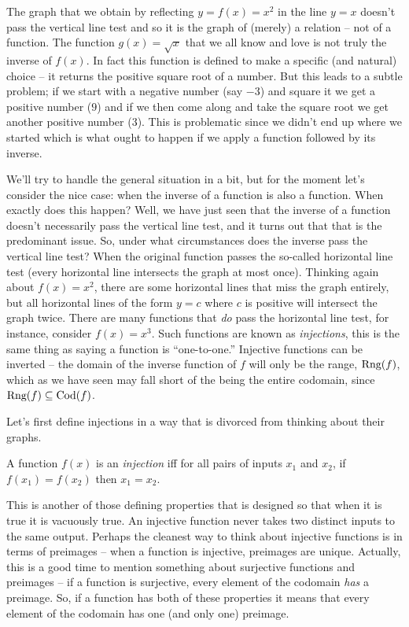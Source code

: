 The graph that we obtain by reflecting $y=f(x)=x^2$ in the line $y=x$ doesn't
pass the vertical line test and so it is the graph of (merely) a relation 
-- not of a function.  The function $g(x) = \sqrt{x}$ that we all know 
and love is not truly the inverse of $f(x)$.  In fact this function is
defined to make a specific (and natural) choice -- it returns the positive
square root of a number.  But this leads to a subtle problem; if we start
with a negative number (say $-3$) and square it we get a positive number ($9$)
and if we then come along and take the square root we get another positive
number ($3$).  This is problematic since we didn't end up where we started
which is what ought to happen if we apply a function followed by its inverse.

We'll try to handle the general situation in a bit, but for the moment let's
consider the nice case: when the inverse of a function is also a function. 
When exactly does this happen?  Well, we have just seen that the inverse
of a function doesn't necessarily pass the vertical line test, and it turns
out that that is the predominant issue.  So, under what circumstances does
the inverse pass the vertical line test?  When the original function 
passes the so-called horizontal line test (every horizontal line
intersects the graph at most once).  Thinking again about $f(x)=x^2$, there
are some horizontal lines that miss the graph entirely, but all horizontal
lines of the form $y=c$ where $c$ is positive will intersect the graph twice.
There are many functions that \emph{do} pass the horizontal line test, for 
instance, consider $f(x) = x^3$.  Such functions are known as 
\emph{injections}, this is the same thing as 
saying a function is ``one-to-one.''   Injective functions can be inverted --
the domain of the inverse function of $f$ will only be the range, $\mbox{Rng}(f)$,
which as we have seen may fall short of the being the entire codomain, since 
$\mbox{Rng}(f) \subseteq \mbox{Cod}(f)$.

Let's first define injections in a way that is divorced from thinking
about their graphs.

\begin{defi}
A function $f(x)$ is an \emph{injection} iff for all pairs of 
inputs $x_1$ and $x_2$, if $f(x_1) = f(x_2)$ then $x_1=x_2$.
\end{defi}

This is another of those defining properties that is designed so
that when it is true it is vacuously true.  An injective function
never takes two distinct inputs to the same output.  Perhaps the 
cleanest way to think about injective functions is in terms of 
preimages -- when a function is injective, preimages are unique.
Actually, this is a good time to mention something about surjective
functions and preimages -- if a function is surjective, every element
of the codomain \emph{has} a preimage.  So, if a function has both 
of these properties it means that every element of the codomain
has one (and only one) preimage.   

